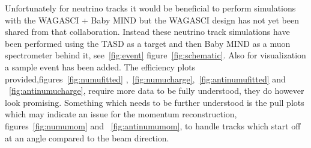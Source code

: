 Unfortunately for neutrino tracks it would be beneficial to perform simulations with the WAGASCI + Baby MIND but the WAGASCI design has not yet been shared from that collaboration. Instead these neutrino track simulations have been performed using the TASD as a target and then Baby MIND as a muon spectrometer behind it, see~\ref{fig:event} figure~\ref{fig:schematic}. Also for visualization a sample event has been added. The efficiency plots provided,figures~\ref{fig:numufitted} ,~\ref{fig:numucharge},~\ref{fig:antinumufitted} and ~\ref{fig:antinumucharge}, require more data to be fully understood, they do however look promising. Something which needs to be further understood is the pull plots which may indicate an issue for the momentum reconstruction, figures~\ref{fig:numumom}  and ~\ref{fig:antinumumom}, to handle tracks which start off at an angle compared to the beam direction.

